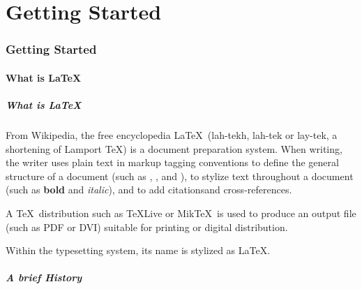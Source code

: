 \part{Getting Started}

\section{Getting Started}
\begin{frame}
\end{frame}

\subsection{What is \LaTeX}

\begin{frame}
	\frametitle{What is \LaTeX}
	\begin{block}{From Wikipedia, the free encyclopedia\footnotemark[1]}
		\LaTeX\ (lah-tekh, lah-tek or lay-tek, a shortening of Lamport \TeX) is a document preparation system. When writing, the writer uses plain text in markup tagging conventions to define the general structure of a document (such as , , and ), to stylize text throughout a document (such as \textbf{bold} and \textit{italic}), and to add citations\footnotemark[1] and cross-references. \medskip
		
		A \TeX\ distribution such as \TeX Live or Mik\TeX\ is used to produce an output file (such as PDF or DVI) suitable for printing or digital distribution. \medskip
		
		Within the typesetting system, its name is stylized as \LaTeX.	
	\end{block}
	

\end{frame}

\begin{frame}
	\frametitle{A brief History}
	
\end{frame}

